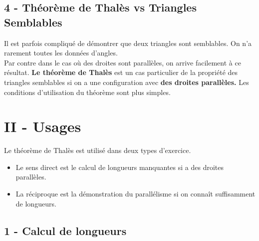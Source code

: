 \documentclass[11pt]{article}
\begin{document}
\newpage
\subsection*{4 - Théorème de Thalès vs Triangles Semblables}

Il est parfois compliqué de démontrer que deux triangles sont semblables. On n'a rarement toutes les données d'angles.  \\

Par contre dans le cas où des droites sont parallèles, on arrive facilement à ce résultat. \textbf{Le théorème de Thalès} est un cas particulier de la propriété des triangles semblables si on a une configuration avec \textbf{des droites parallèles.} Les conditions d'utilisation du théorème sont plus simples. 

\section*{II - Usages}

Le théorème de Thalès est utilisé dans deux types d'exercice.

\begin{itemize}
  \item Le sens direct est le calcul de longueurs manquantes si a des droites parallèles.  
  \item La réciproque est la démonstration du parallélisme si on connaît suffisamment de longueurs.
\end{itemize}



\subsection*{1 - Calcul de longueurs}
\end{document}
